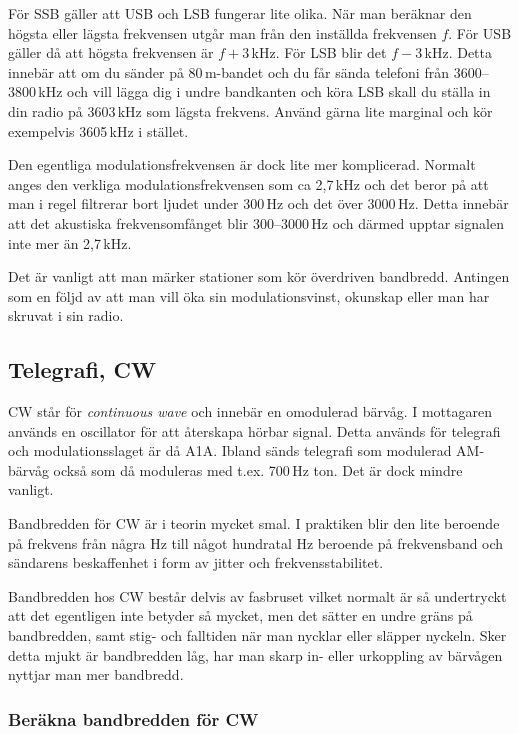 För SSB gäller att USB och LSB fungerar lite olika. När man beräknar den
högsta eller lägsta frekvensen utgår man från den inställda frekvensen $f$.
För USB gäller då att högsta frekvensen är $f+3$\,kHz. För LSB blir det
$f-3$\,kHz. Detta innebär att om du sänder på 80\,m-bandet och du får sända
telefoni från 3600--3800\,kHz och vill lägga dig i undre bandkanten och köra
LSB skall du ställa in din radio på 3603\,kHz som lägsta frekvens. Använd
gärna lite marginal och kör exempelvis 3605\,kHz i stället.

Den egentliga modulationsfrekvensen är dock lite mer komplicerad. Normalt
anges den verkliga modulationsfrekvensen som ca 2,7\,kHz och det beror på att
man i regel filtrerar bort ljudet under 300\,Hz och det över 3000\,Hz. Detta
innebär att det akustiska frekvensomfånget blir 300--3000\,Hz och därmed
upptar signalen inte mer än 2,7\,kHz.

Det är vanligt att man märker stationer som kör överdriven bandbredd. Antingen
som en följd av att man vill öka sin modulationsvinst, okunskap eller man har
skruvat i sin radio.

\subsection{Telegrafi, CW}

CW står för {\it continuous wave} och innebär en omodulerad bärvåg. I
mottagaren används en oscillator för att återskapa hörbar signal. Detta
används för telegrafi och modulationsslaget är då A1A. Ibland sänds
telegrafi som modulerad AM-bärvåg också som då moduleras med t.ex. 700\,Hz
ton. Det är dock mindre vanligt.

Bandbredden för CW är i teorin mycket smal. I praktiken blir den lite beroende
på frekvens från några Hz till något hundratal Hz beroende på frekvensband och
sändarens beskaffenhet i form av jitter och frekvensstabilitet.

Bandbredden hos CW består delvis av fasbruset vilket normalt är så undertryckt att det
egentligen inte betyder så mycket, men det sätter en undre gräns på bandbredden,
samt stig- och falltiden när man nycklar eller släpper nyckeln.
Sker detta mjukt är bandbredden låg, har man skarp in- eller urkoppling av
bärvågen nyttjar man mer bandbredd.

\subsubsection{Beräkna bandbredden för CW}

